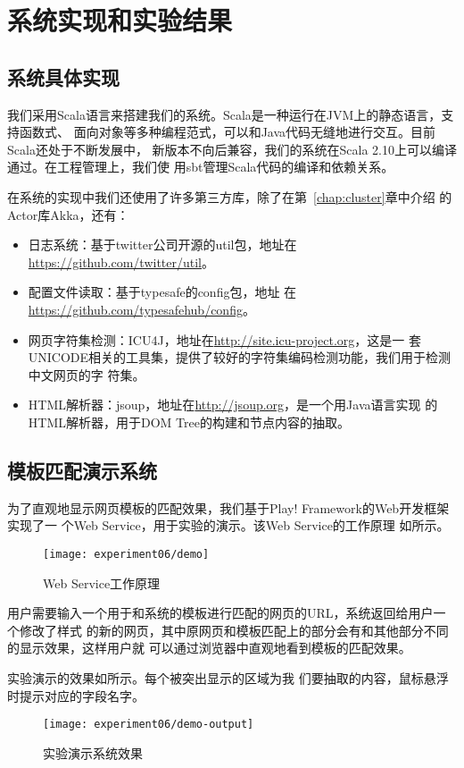 
\chapter{系统实现和实验结果}
\label{chap:experiment}

\section{系统具体实现}
\label{sec:implementation}
我们采用Scala语言来搭建我们的系统。Scala是一种运行在JVM上的静态语言，支持函数式、
面向对象等多种编程范式，可以和Java代码无缝地进行交互。目前Scala还处于不断发展中，
新版本不向后兼容，我们的系统在Scala 2.10上可以编译通过。在工程管理上，我们使
用sbt管理Scala代码的编译和依赖关系。

在系统的实现中我们还使用了许多第三方库，除了在第~\ref{chap:cluster}章中介绍
的Actor库Akka，还有：
\begin{itemize}
\item 日志系统：基于twitter公司开源的util包，地址在
  \url{https://github.com/twitter/util}。
\item 配置文件读取：基于typesafe的config包，地址
  在\url{https://github.com/typesafehub/config}。
\item 网页字符集检测：ICU4J，地址在\url{http://site.icu-project.org}，这是一
  套UNICODE相关的工具集，提供了较好的字符集编码检测功能，我们用于检测中文网页的字
  符集。
\item HTML解析器：jsoup，地址在\url{http://jsoup.org}，是一个用Java语言实现
  的HTML解析器，用于DOM Tree的构建和节点内容的抽取。
\end{itemize}
\section{模板匹配演示系统}
\label{sec:demo}
为了直观地显示网页模板的匹配效果，我们基于Play! Framework的Web开发框架实现了一
个Web Service，用于实验的演示。该Web Service的工作原理
如所示。
\begin{figure}
  \centering
  \texttt{[image: experiment06/demo]}
  \caption{Web Service工作原理}
  \label{experiment:fig:demo}
\end{figure}

用户需要输入一个用于和系统的模板进行匹配的网页的URL，系统返回给用户一个修改了样式
的新的网页，其中原网页和模板匹配上的部分会有和其他部分不同的显示效果，这样用户就
可以通过浏览器中直观地看到模板的匹配效果。

实验演示的效果如所示。每个被突出显示的区域为我
们要抽取的内容，鼠标悬浮时提示对应的字段名字。
\begin{figure}[h]
  \centering
  \texttt{[image: experiment06/demo-output]}
  \caption{实验演示系统效果}
  \label{experiment:fig:demoresult}
\end{figure}

